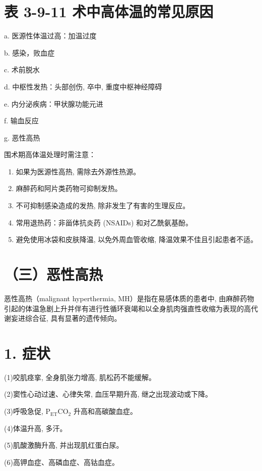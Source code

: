 \documentclass[10pt]{article}
\begin{document}
\section*{表 3-9-11 术中高体温的常见原因}
a. 医源性体温过高：加温过度

b. 感染，败血症

c. 术前脱水

d. 中枢性发热：头部创伤, 卒中, 重度中枢神经障碍

e. 内分泌疾病：甲状腺功能元进

f. 输血反应

g. 恶性高热

围术期高体温处理时需注意：

\begin{enumerate}
  \item 如果为医源性高热, 需除去外源性热源。

  \item 麻醉药和阿片类药物可抑制发热。

  \item 不可抑制感染造成的发热, 除非发生了有害的生理反应。

  \item 常用退热药：非甾体抗炎药 (NSAIDs) 和对乙酰氨基酚。

  \item 避免使用冰袋和皮肤降温, 以免外周血管收缩, 降温效果不佳且引起患者不适。

\end{enumerate}

\section*{（三）恶性高热}
恶性高热（malignant hyperthermia, MH）是指在易感体质的患者中, 由麻醉药物引起的体温急剧上升并伴有进行性循环衰竭和以全身肌肉强直性收缩为表现的高代谢妄进综合征, 具有显著的遗传倾向。

\section*{1. 症状}
(1)咬肌痉挛, 全身肌张力增高, 肌松药不能缓解。

(2)窦性心动过速、心律失常, 血压早期升高, 继之出现波动或下降。

(3)呼吸急促, $\mathrm{P}_{\mathrm{ET}} \mathrm{CO}_{2}$ 升高和高碳酸血症。

(4)体温升高, 多汗。

(5)肌酸激酶升高, 并出现肌红蛋白尿。

(6)高钾血症、高磷血症、高钴血症。
\end{document}
